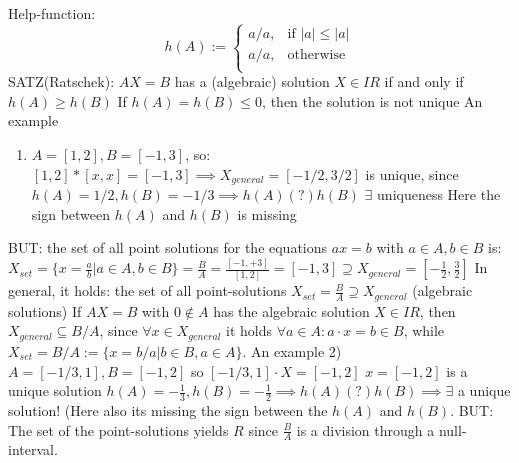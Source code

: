 \documentclass[a4paper, 11pt]{report}
\theoremstyle{break}
\theoremstyle{proofstyle}
\begin{document}
\begin{itemize}
    \newline Help-function: 
    $$
      h(A):=
      \begin{cases}
        a/a, & \text{if } |a|\leqslant|a|\\
        a/a, & \text{otherwise } \\
      \end{cases}
    $$
    \newline SATZ(Ratschek):
    \newline $AX=B$ has a (algebraic) solution $X\in IR$ if and only if $h(A)\geqslant h(B)$
    \newline If $h(A)=h(B)\leqslant 0$, then the solution is not unique 
    \newline An example
    \begin{enumerate}
        \item $A=[1,2], B=[-1,3]$, so: $[1,2]*[x,x]=[-1,3] \implies X_{general}=[-1/2,3/2]$ is unique, since $h(A)=1/2, h(B)=-1/3 \implies h(A)(?)h(B)$ \to $\exists$ uniqueness
        \newline Here the sign between $h(A)$ and $h(B)$ is missing
    \end{enumerate}
    \newline BUT: the set of all point solutions for the equations $ax=b$ with $a\in A, b\in B $ is:
    \newline $X_{set}=\{x=\frac{a}{b}| a\in A, b\in B\}=\frac{B}{A}=\frac{[-1,+3]}{[1,2]}=[-1,3]\supseteq X_{general}=[-\frac{1}{2},\frac{3}{2}]$
    \newline \square In general, it holds: the set of all point-solutions $X_{set}=\frac{B}{A}\supseteq X_{general}$ (algebraic solutions)
    \newline If $AX=B $ with $0\not \in A$ has the algebraic solution $X\in IR$, then $X_{general}\subseteq B/A$, since $\forall x\in X_{general}$ it holds $\forall a\in A: a\cdot x=b \in B$, while $X_{set}=B/A:=\{x=b/a| b\in B, a\in A\}$.
    \newline An example 2)
    \newline $A=[-1/3,1], B=[-1,2]$ so $[-1/3,1]\cdot X=[-1,2]$ \implies $x=[-1,2]$ is a unique solution
    \newline $h(A)=-\frac{1}{3}, h(B)=-\frac{1}{2} \implies h(A)(?)h(B) \implies \exists$ a unique solution!
    \newline (Here also its missing the sign between the $h(A)$ and $h(B)$.
    \newline BUT:
    \newline The set of the point-solutions yields $R$ since $\frac{B}{A}$ is a division through a null-interval. 
\end{itemize} 
\end{document}
